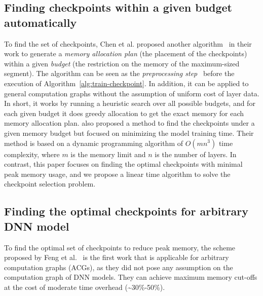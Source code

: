 \subsection{Finding checkpoints within a given budget automatically}

To find the set of checkpoints, Chen et al. proposed another algorithm~\cite{chen2016training} in their work to generate a {\em memory allocation plan} (the placement of the checkpoints) within a given {\em budget} (the restriction on the memory of the maximum-sized segment). 
The algorithm can be seen as the {\em preprocessing step}~\cite{feng2021optimal} before the execution of Algorithm~\ref{alg:train-checkpoint}. 
In addition, it can be applied to general computation graphs without the assumption of uniform cost of layer data.
In short, it works by running a heuristic search over all possible budgets, and for each given budget it does greedy allocation to get the exact memory for each memory allocation plan.
\citet{herrmann2019optimal} also proposed a method to find the checkpoints under a given memory budget but focused on minimizing the model training time.
Their method is based on a dynamic programming algorithm of $O(mn^3)$ time complexity, where $m$ is the memory limit and $n$ is the number of layers.
In contrast, this paper focuses on finding the optimal checkpoints with minimal peak memory usage, and we propose a linear time algorithm to solve the checkpoint selection problem.



\subsection{Finding the optimal checkpoints for arbitrary DNN model}

To find the optimal set of checkpoints to reduce peak memory, the scheme proposed by Feng et al.~\cite{feng2021optimal} is the first work that is applicable for arbitrary computation graphs (ACGs), as they did not pose any assumption on the computation graph of DNN models. They can achieve maximum memory cut-offs at the cost of moderate time overhead (\textasciitilde 30\%-50\%).

